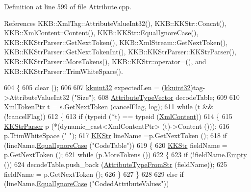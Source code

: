 Definition at line 599 of file Attribute.\+cpp.



References K\+K\+B\+::\+Xml\+Tag\+::\+Attribute\+Value\+Int32(), K\+K\+B\+::\+K\+K\+Str\+::\+Concat(), K\+K\+B\+::\+Xml\+Content\+::\+Content(), K\+K\+B\+::\+K\+K\+Str\+::\+Equal\+Ignore\+Case(), K\+K\+B\+::\+K\+K\+Str\+Parser\+::\+Get\+Next\+Token(), K\+K\+B\+::\+Xml\+Stream\+::\+Get\+Next\+Token(), K\+K\+B\+::\+K\+K\+Str\+Parser\+::\+Get\+Next\+Token\+Int(), K\+K\+B\+::\+K\+K\+Str\+Parser\+::\+K\+K\+Str\+Parser(), K\+K\+B\+::\+K\+K\+Str\+Parser\+::\+More\+Tokens(), K\+K\+B\+::\+K\+K\+Str\+::operator=(), and K\+K\+B\+::\+K\+K\+Str\+Parser\+::\+Trim\+White\+Space().


\begin{DoxyCode}
604 \{
605   clear ();
606 
607   \hyperlink{namespace_k_k_b_af8d832f05c54994a1cce25bd5743e19a}{kkuint32}  expectedLen = (\hyperlink{namespace_k_k_b_af8d832f05c54994a1cce25bd5743e19a}{kkuint32})tag->AttributeValueInt32 (\textcolor{stringliteral}{"Size"});
608   \hyperlink{class_k_k_m_l_l_1_1_attribute_type_vector}{AttributeTypeVector} decodeTable;
609 
610   \hyperlink{class_k_k_b_1_1_xml_token}{XmlTokenPtr} t = s.\hyperlink{class_k_k_b_1_1_xml_stream_a87cc738b05c666cf5d5c25beaab477b4}{GetNextToken} (cancelFlag, log);
611   \textcolor{keywordflow}{while}  (t  &&  (!cancelFlag))
612   \{
613     \textcolor{keywordflow}{if}  (\textcolor{keyword}{typeid} (*t) == \textcolor{keyword}{typeid} (\hyperlink{class_k_k_b_1_1_xml_content}{XmlContent}))
614     \{
615       \hyperlink{class_k_k_b_1_1_k_k_str_parser}{KKStrParser} p (*(dynamic\_cast<XmlContentPtr> (t)->Content ()));
616       p.TrimWhiteSpace (\textcolor{stringliteral}{" "});
617       \hyperlink{class_k_k_b_1_1_k_k_str}{KKStr}  lineName =p.GetNextToken ();
618       \textcolor{keywordflow}{if}  (lineName.\hyperlink{class_k_k_b_1_1_k_k_str_a562f9696417c53f66bc4088eac072ab5}{EqualIgnoreCase} (\textcolor{stringliteral}{"CodeTable"}))
619       \{
620         \hyperlink{class_k_k_b_1_1_k_k_str}{KKStr}  fieldName = p.GetNextToken ();
621         \textcolor{keywordflow}{while}  (p.MoreTokens ())
622         \{
623           \textcolor{keywordflow}{if}  (!fieldName.\hyperlink{class_k_k_b_1_1_k_k_str_ac69942f73fffd672ec2a6e1c410afdb6}{Empty} ())
624             decodeTable.push\_back (\hyperlink{namespace_k_k_m_l_l_a6ce7dcc549393faf321ebfb02f426e9e}{AttributeTypeFromStr} (fieldName));
625           fieldName = p.GetNextToken ();
626         \}
627       \}
628 
629       \textcolor{keywordflow}{else} \textcolor{keywordflow}{if}  (lineName.\hyperlink{class_k_k_b_1_1_k_k_str_a562f9696417c53f66bc4088eac072ab5}{EqualIgnoreCase} (\textcolor{stringliteral}{"CodedAttributeValues"}))

\end{DoxyCode}
